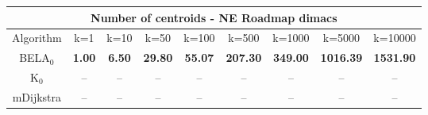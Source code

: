 \begin{tabular}{c|cccccccc}\toprule
\multicolumn{9}{c}{Number of centroids - NE Roadmap dimacs}\\ \midrule
Algorithm & k=1 & k=10 & k=50 & k=100 & k=500 & k=1000 & k=5000 & k=10000 \\ \midrule
BELA$_0$ & \textbf{1.00} & \textbf{6.50} & \textbf{29.80} & \textbf{55.07} & \textbf{207.30} & \textbf{349.00} & \textbf{1016.39} & \textbf{1531.90} \\
K$_0$ & -- & -- & -- & -- & -- & -- & -- & -- \\
mDijkstra & -- & -- & -- & -- & -- & -- & -- & -- \\ \bottomrule 
\end{tabular}
